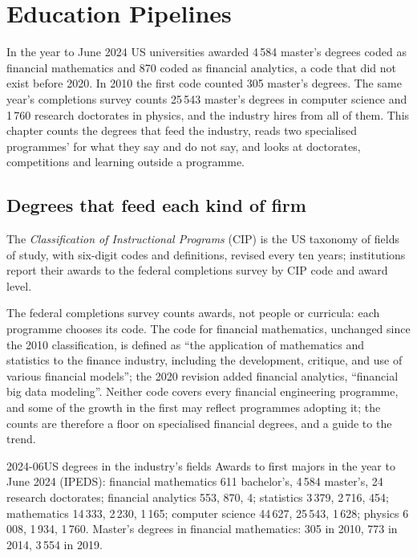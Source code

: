 \chapter{Education Pipelines}\label{ch:in:education-pipelines}

In the year to June 2024 US universities awarded 4\,584 master's degrees coded as financial mathematics and 870 coded as
financial analytics, a code that did not exist before 2020. In 2010 the first code counted 305 master's degrees. The
same year's completions survey counts 25\,543 master's degrees in computer science and 1\,760 research doctorates in
physics, and the industry hires from all of them. This chapter counts the degrees that feed the industry, reads two
specialised programmes'  for what they say and do not say, and looks at doctorates, competitions and
learning outside a programme.

\section{Degrees that feed each kind of firm}

\begin{definition}\label{def:in:education-pipelines:cip}
The \emph{Classification of Instructional Programs} (CIP) is the US
taxonomy of fields of study, with six-digit codes and definitions, revised every ten years; institutions report their
awards to the federal completions survey by CIP code and award level.
\end{definition}

The federal completions survey counts awards, not people or curricula: each programme chooses its code. The code for
financial mathematics, unchanged since the 2010 classification, is defined as ``the application of mathematics and
statistics to the finance industry, including the development, critique, and use of various financial models''; the
2020 revision added financial analytics, ``financial big data modeling''. Neither code covers every financial engineering
programme, and some of the growth in the first may reflect programmes adopting it; the counts are therefore a floor on
specialised financial degrees, and a guide to the trend.

\begin{dated}{2024-06}{US degrees in the industry's fields}\label{dat:in:education-pipelines:degrees}
Awards to first majors in the year to June 2024 (IPEDS): financial mathematics 611 bachelor's, 4\,584 master's, 24
research doctorates; financial analytics 553, 870, 4; statistics 3\,379, 2\,716, 454; mathematics 14\,333, 2\,230,
1\,165; computer science 44\,627, 25\,543, 1\,628; physics 6\,008, 1\,934, 1\,760. Master's degrees in financial mathematics:
305 in 2010, 773 in 2014, 3\,554 in 2019.
\end{dated}

